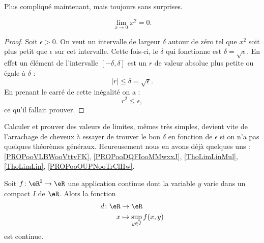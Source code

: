 Plus compliqué maintenant, mais toujours sans surprises.

\begin{proposition}
\[
  \lim_{x\to 0}x^2=0.
\]

\end{proposition}

\begin{proof}
Soit $\epsilon>0$. On veut un intervalle de largeur $\delta$ autour de zéro tel que $x^2$ soit plus petit que $\epsilon$ sur cet intervalle. Cette fois-ci, le $\delta$ qui fonctionne est $\delta=\sqrt{\epsilon}$. En effet un élément de l'intervalle $[-\delta,\delta]$ est un $r$ de valeur absolue plus petite ou égale à $\delta$ :
\[
| r |\leq\delta=\sqrt{\epsilon}.
\]
En prenant le carré de cette inégalité on a :
\[
  r^2\leq\epsilon,
\]
ce qu'il fallait prouver.
\end{proof}

Calculer et prouver des valeurs de limites, mêmes très simples, devient vite de l'arrachage de cheveux à essayer de trouver le bon $\delta$ en fonction de $\epsilon$ si on n'a pas quelques théorèmes généraux. Heureusement nous en avons déjà quelques uns : \ref{PROPooVLBWooVttvFK}, \ref{PROPooDQFIooMMwxxJ}, \ref{ThoLimLinMul}, \ref{ThoLimLin}, \ref{PROPooOUPNooTrClHw}.

\begin{proposition}      \label{PROPooWXBAooAEweSF}
    Soit \( f\colon \eR^2\to \eR\) une application continue dont la variable \( y\) varie dans un compact \( I\) de \( \eR\). Alors la fonction
    \begin{equation}
        \begin{aligned}
            d\colon \eR&\to \eR \\
            x&\mapsto \sup_{y\in I} f(x,y)
        \end{aligned}
    \end{equation}
    est continue.
\end{proposition}

